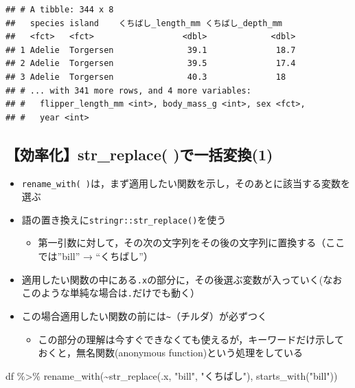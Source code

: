 \documentclass[
  xelatex,ja=standard, b5paper]{bxjsbook}
\newenvironment{Shaded}{\begin{snugshade}}{\end{snugshade}}
\newcommand{\FunctionTok}[1]{\textcolor[rgb]{0.00,0.00,0.00}{#1}}
\newcommand{\NormalTok}[1]{#1}
\newcommand{\SpecialCharTok}[1]{\textcolor[rgb]{0.00,0.00,0.00}{#1}}
\newcommand{\StringTok}[1]{\textcolor[rgb]{0.31,0.60,0.02}{#1}}
\providecommand{\tightlist}{%
  \setlength{\itemsep}{0pt}\setlength{\parskip}{0pt}}
\begin{document}
\begin{verbatim}
## # A tibble: 344 x 8
##   species island    くちばし_length_mm くちばし_depth_mm
##   <fct>   <fct>                  <dbl>             <dbl>
## 1 Adelie  Torgersen               39.1              18.7
## 2 Adelie  Torgersen               39.5              17.4
## 3 Adelie  Torgersen               40.3              18  
## # ... with 341 more rows, and 4 more variables:
## #   flipper_length_mm <int>, body_mass_g <int>, sex <fct>,
## #   year <int>
\end{verbatim}

\hypertarget{rename-strreplace1}{%
\subsection{【効率化】str\_replace( )で一括変換(1)}\label{rename-strreplace1}}

\begin{itemize}
\tightlist
\item
  \texttt{rename\_with(\ )}は，まず適用したい関数を示し，そのあとに該当する変数を選ぶ
\item
  語の置き換えに\texttt{stringr::str\_replace()}を使う

  \begin{itemize}
  \tightlist
  \item
    第一引数に対して，その次の文字列をその後の文字列に置換する（ここでは''bill'' → ``くちばし''）
  \end{itemize}
\item
  適用したい関数の中にある\texttt{.x}の部分に，その後選ぶ変数が入っていく(なおこのような単純な場合は\texttt{.}だけでも動く）
\item
  この場合適用したい関数の前には\texttt{\textasciitilde{}}（チルダ）が必ずつく

  \begin{itemize}
  \tightlist
  \item
    この部分の理解は今すぐできなくても使えるが，キーワードだけ示しておくと，無名関数(anonymous function)という処理をしている
  \end{itemize}
\end{itemize}

\begin{Shaded}
\begin{Highlighting}[]
\NormalTok{df }\SpecialCharTok{\%\textgreater{}\%} 
  \FunctionTok{rename\_with}\NormalTok{(}\SpecialCharTok{\textasciitilde{}}\FunctionTok{str\_replace}\NormalTok{(.x, }\StringTok{"bill"}\NormalTok{, }\StringTok{"くちばし"}\NormalTok{),}
              \FunctionTok{starts\_with}\NormalTok{(}\StringTok{"bill"}\NormalTok{))}
\end{Highlighting}
\end{Shaded}
\end{document}
